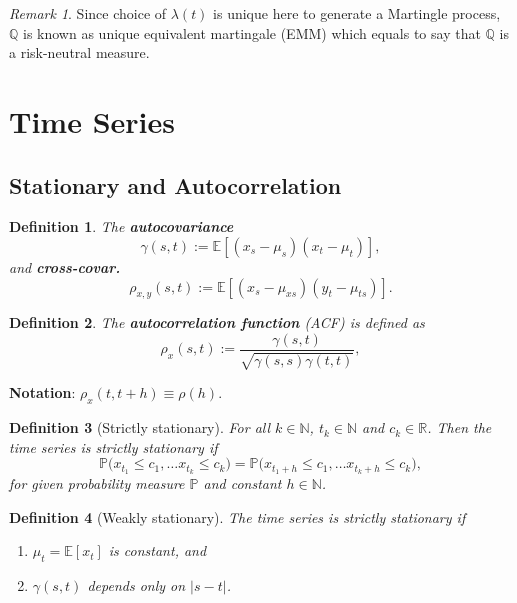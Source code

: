 \documentclass[10pt]{article}
\theoremstyle{remark}
\newtheorem{Remark}{Remark}[section]
\theoremstyle{plain}
\newtheorem{Definition}{Definition}[section]
\newcommand{\R}{\mathbb{R}}
\newcommand{\N}{\mathbb{N}}
\numberwithin{equation}{section}
\renewcommand{\leq}{\leqslant}
\begin{document}
\begin{Remark}
	Since choice of $\lambda(t)$ is unique here to generate a Martingle process, $\mathbb{Q}$ is known as unique equivalent martingale (EMM) which equals to say that $\mathbb{Q}$ is a risk-neutral measure.
\end{Remark}
%
%
\clearpage
\section{Time Series}

\subsection{Stationary and Autocorrelation}

\begin{Definition}
	The \textbf{autocovariance} $$\gamma (s,t) := \mathds{E} \left[(x_s - \mu_s) (x_t-\mu_t)\right],$$ and \textbf{cross-covar.} $$\rho_{x,y}(s,t):= \mathds{E}\left[(x_s - \mu_{xs})(y_t - \mu_{ts})\right].$$
\end{Definition}

\begin{Definition}
	The \textbf{autocorrelation function} (ACF) is defined as
	\[
	\rho_{x} (s,t)  := \frac{\gamma(s,t)}{\sqrt{\gamma(s,s)\gamma(t,t)}},
	\]
\end{Definition}

\textbf{Notation}: $\rho_{x}(t, t+h)  \equiv \rho(h)$.

\begin{Definition}[Strictly stationary]
	For all $k \in \N$, $t_k \in \N$ and $c_k \in \R$. Then the time series is strictly stationary if
	\[
	\mathds{P} \big(x_{t_1} \leq c_1, \dots x_{t_k} \leq c_k \big) = \mathds{P} \big(x_{t_1+h} \leq c_1, \dots x_{t_k+h} \leq c_k \big),
	\]
	for given probability measure $\mathds{P}$ and constant $h \in \N$.
\end{Definition}


\begin{Definition}[Weakly stationary]
	The time series is strictly stationary if
	\begin{enumerate}
		\item $\mu_t = \mathds{E}[x_t]$ is constant, and
		
		\item $\gamma(s,t)$ depends only on $|s-t|$. 
	\end{enumerate}
\end{Definition}
\end{document}
